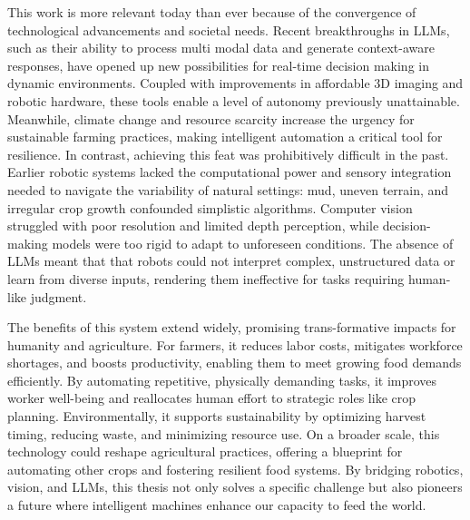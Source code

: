 This work is more relevant today than ever because of the convergence of technological advancements and societal needs. Recent 
breakthroughs in LLMs, such as their ability to process multi modal data and generate context-aware responses, have opened up new 
possibilities for real-time decision making in dynamic environments. Coupled with improvements in affordable 3D imaging and robotic 
hardware, these tools enable a level of autonomy previously unattainable. Meanwhile, climate change and resource scarcity increase 
the urgency for sustainable farming practices, making intelligent automation a critical tool for resilience. In contrast, achieving 
this feat was prohibitively difficult in the past. Earlier robotic systems lacked the computational power and sensory integration 
needed to navigate the variability of natural settings: mud, uneven terrain, and irregular crop growth confounded simplistic 
algorithms. Computer vision struggled with poor resolution and limited depth perception, while decision-making models were too 
rigid to adapt to unforeseen conditions. The absence of LLMs meant that that robots could not interpret complex, unstructured 
data or learn from diverse inputs, rendering them ineffective for tasks requiring human-like judgment.

The benefits of this system extend widely, promising trans-formative impacts for humanity and agriculture. For farmers, it reduces 
labor costs, mitigates workforce shortages, and boosts productivity, enabling them to meet growing food demands efficiently. By 
automating repetitive, physically demanding tasks, it improves worker well-being and reallocates human effort to strategic roles 
like crop planning. Environmentally, it supports sustainability by optimizing harvest timing, reducing waste, and minimizing 
resource use. On a broader scale, this technology could reshape agricultural practices, offering a blueprint for automating 
other crops and fostering resilient food systems. By bridging robotics, vision, and LLMs, this thesis not only solves a 
specific challenge but also pioneers a future where intelligent machines enhance our capacity to feed the world.


